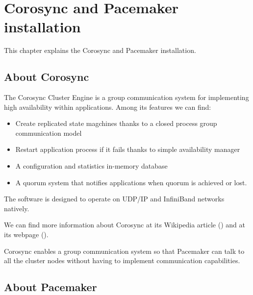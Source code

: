 

\chapter{Corosync and Pacemaker installation}
\label{chap:corosync-pacemaker-installation}
This chapter explains the Corosync and Pacemaker installation.

\section {About Corosync}
The Corosync Cluster Engine is a group communication system for implementing high availability within applications. Among its features we can find:
\begin{itemize}
  \item Create replicated state magchines thanks to a closed process group communication model
  \item Restart application process if it fails thanks to simple availability manager
  \item A configuration and statistics in-memory database
  \item A quorum system that notifies applications when quorum is achieved or lost.
\end{itemize}


The software is designed to operate on UDP/IP and InfiniBand networks natively.

We can find more information about Corosync at its Wikipedia article (\cite{WikipediaCorosync}) and at its webpage (\cite{CorosyncWebpage}).

Corosync enables a group communication system so that Pacemaker can talk to all the cluster nodes without having to implement communication capabilities.

\section {\label{sec:about-pacemaker}About Pacemaker}

